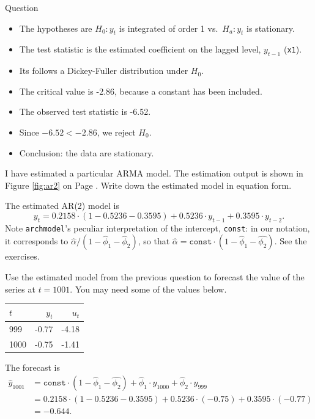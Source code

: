 \documentclass[12pt, a4paper]{article}
\begin{document}
\begin{exam}{Question \thequestion}
\begin{problem}[6]
\begin{solution}[10cm]
\begin{itemize}
\item The hypotheses are $H_0: y_t$ is integrated of order 1 vs.\ $H_a: y_t$ is stationary.
\item The test statistic is the estimated coefficient on the lagged level, $y_{t-1}$ (\texttt{x1}).
\item Its follows a Dickey-Fuller distribution  under $H_0$.
\item The critical value is -2.86, because a constant has been included.
\item The observed test statistic is -6.52.
\item Since $-6.52 < -2.86$, we reject $H_0$.
\item Conclusion: the data are stationary.
\end{itemize}
\end{solution}
\end{problem}
\begin{problem}[3]
I have estimated a particular ARMA model. The estimation output is shown in Figure \ref{fig:ar2} on Page \pageref{fig:ar2}. Write down the estimated model in equation form.
\begin{solution}[10cm]
The estimated AR(2) model is
\[
y_t =0.2158\cdot (1-0.5236-0.3595) +  0.5236\cdot  y_{t-1} + 0.3595 \cdot y_{t-2}.
\]
Note \texttt{archmodel}'s peculiar interpretation of the intercept, \texttt{const}: in our notation, it corresponds to $\hat{\alpha}/ (1-\hat{\phi}_1-\hat{\phi}_2)$, so that $\hat{\alpha} = \mathtt{const}\cdot (1-\hat{\phi}_1 - \hat{\phi_2})$. See the exercises.
\end{solution}
\end{problem}
\begin{problem}[6]
Use the estimated model from the previous question to forecast the value of the series at $t=1001$. You may need some of the values below.
\begin{center}
\begin{tabular}{lrr}
\toprule
$t$ & $y_t$ & $u_t$\\
\midrule
999 & -0.77 & -4.18\\
1000& -0.75 & -1.41\\
\bottomrule
\end{tabular}
\end{center}
\begin{solution}[5cm]
The forecast is
\begin{align*}
\widehat{y}_{1001} &= \mathtt{const}\cdot (1-\hat{\phi}_1 - \hat{\phi_2})+\hat{\phi}_1\cdot  y_{1000} + \hat{\phi}_2 \cdot y_{999}\\
&=  0.2158 \cdot (1-0.5236-0.3595) + 0.5236\cdot  (-0.75) + 0.3595 \cdot (-0.77)\\
&= -0.644.
\end{align*}
\end{solution}
\end{problem}

\end{exam}
\end{document}
